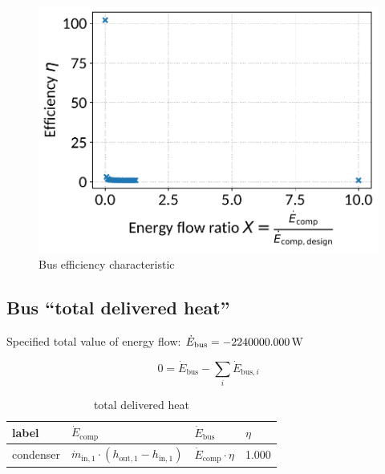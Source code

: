 \begin{minipage}{0.5\textwidth}
\begin{figure}[H]\begin{center}
\includegraphics[width=\textwidth]{figures/Bus_CharLine_evaporator_reciculation_pumpoffdesign.pdf}
\caption{Bus efficiency characteristic}
\label{fig:Bus_CharLine_evaporator reciculation pumpoffdesign}
\end{center}\end{figure}

\end{minipage}

\subsection{Bus ``total delivered heat''}

Specified total value of energy flow: $\dot{E}_\mathrm{bus} = \unit[-2240000.000]{W}$

\begin{equation}
\label{eq:Bus_energy_flow_sum}
0=\dot{E}_\mathrm{bus} -\sum_i \dot{E}_{\mathrm{bus,}i}
\end{equation}

\begin{table}[H]\begin{center}
\begin{tabular}{llll}
\toprule
     label &                                                         $\dot{E}_\mathrm{comp}$ &              $\dot{E}_\mathrm{bus}$ & $\eta$ \\
\midrule
 condenser &  $\dot{m}_\mathrm{in,1} \cdot \left(h_\mathrm{out,1} - h_\mathrm{in,1} \right)$ &  $\dot{E}_\mathrm{comp} \cdot \eta$ &  1.000 \\
\bottomrule
\end{tabular}
\caption{total delivered heat}
\end{center}\end{table}




